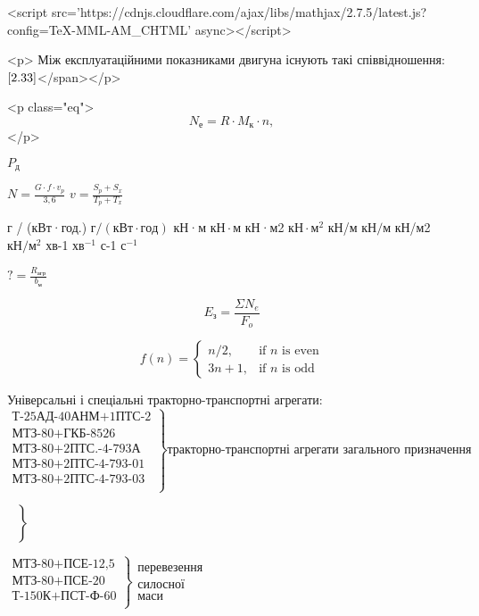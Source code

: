 <script src='https://cdnjs.cloudflare.com/ajax/libs/mathjax/2.7.5/latest.js?config=TeX-MML-AM_CHTML' async></script>

<p> Між експлуатаційними показниками
  двигуна існують такі співвідношення: \(\ref{2.33}\)</span></p>

  <p class="eq">
    $$
N_{е}={R\cdot M_{к} \cdot n}, \tag{2.33} \label{2.33}
    $$
  </p>

\(P_д\)

\displaystyle \(N=\frac{G \cdot f \cdot v_p}{3,6}\)
\(\displaystyle v=\frac{S_p+S_x}{T_p+T_x}\)


г / (кВт·год.) \( г / (кВт \cdot год) \)
кН·м           \( кН \cdot м \)
кН·м2          \(кН \cdot м^2\)
кН/м           \(кН/м\)
кН/м2           \(кН/м^2\)
хв-1           \(хв^{-1}\)
с-1            \(с^{-1}\)

\( \displaystyle ?=\frac{R_{агр}}{b_м} \) 

$$
E_{з}=\frac{\Sigma N_e}{F_o}
$$

\(  \)
$$
f(n) = \begin{cases} n/2, & \mbox{if } n\mbox{ is even} \\ 3n+1, & \mbox{if } n\mbox{ is odd} \end{cases}
$$

Універсальні і спеціальні тракторно-транспортні агрегати:
$$
\left.\begin{array}{l}
\mbox{Т-25АД-40АНМ+1ПТС-2}\\
\mbox{МТЗ-80+ГКБ-8526}\\
\mbox{МТЗ-80+2ПТС.-4-793А}\\
\mbox{МТЗ-80+2ПТС-4-793-01}\\
\mbox{МТЗ-80+2ПТС-4-793-03}\\
\end{array}\right\}
\mbox{тракторно-транспортні агрегати загального призначення}
$$

\(
\left.\begin{array}{l}
\mbox{}\\
\mbox{}\\
\mbox{}\\
\mbox{}\\
\mbox{}\\
\end{array}\right\}
\begin{array}{l}
\mbox{} \\
\mbox{} \\
\mbox{}
\end{array}
\)

\(
\left.\begin{array}{l}
\mbox{МТЗ-80+ПСЕ-12,5}\\
\mbox{МТЗ-80+ПСЕ-20}\\
\mbox{Т-150К+ПСТ-Ф-60}\\
\end{array}\right\}
\begin{array}{l}
\mbox{перевезення} \\
\mbox{силосної} \\
\mbox{маси}
\end{array}
\)

